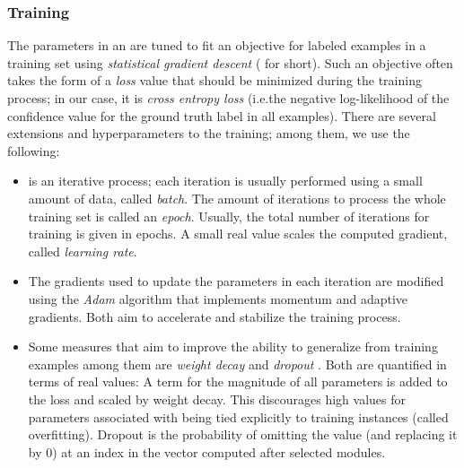 \documentclass[../document.tex]{subfiles}
\begin{document}
    \subsubsection{Training}
    The parameters in an  are tuned to fit an objective for labeled examples in a training set using \emph{statistical gradient descent} ( for short).
    Such an objective often takes the form of a \emph{loss} value that should be minimized during the training process; in our case, it is \emph{cross entropy loss} (i.e.\@ the negative log-likelihood of the confidence value for the ground truth label in all examples).
    There are several extensions and hyperparameters to the training; among them, we use the following:
    \begin{itemize}
        \item
             is an iterative process; each iteration is usually performed using a small amount of data, called \emph{batch}.
            The amount of iterations to process the whole training set is called an \emph{epoch}. Usually, the total number of iterations for training is given in epochs.
            A small real value scales the computed gradient, called \emph{learning rate}.
        \item
            The gradients used to update the parameters in each iteration are modified using the \emph{Adam} algorithm \citep{adam,adamw} that implements momentum and adaptive gradients.
            Both aim to accelerate and stabilize the training process.
        \item
            Some measures that aim to improve the ability to generalize from training examples among them are \emph{weight decay} and \emph{dropout} \citep{dropout}.
            Both are quantified in terms of real values:
                A term for the magnitude of all parameters is added to the loss and scaled by weight decay. This discourages high values for parameters associated with being tied explicitly to training instances (called overfitting).
                Dropout is the probability of omitting the value (and replacing it by \(0\)) at an index in the vector computed after selected modules.
    \end{itemize}
\end{document}
